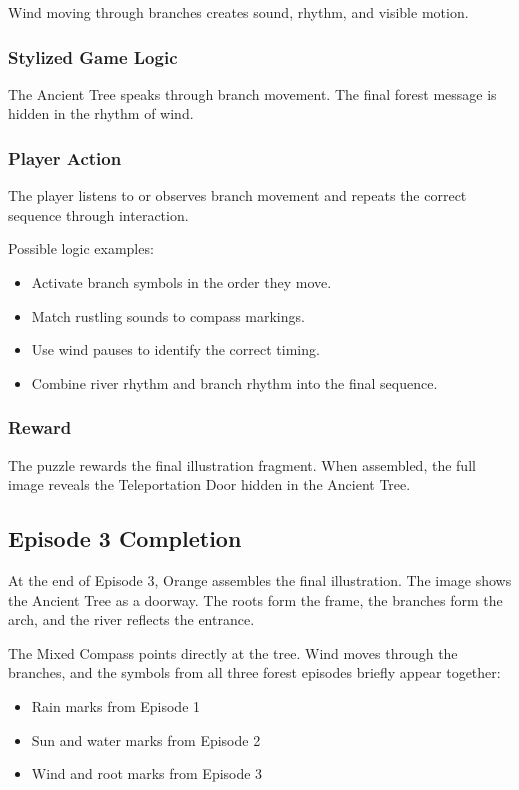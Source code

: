 \documentclass[12pt]{article}
\begin{document}
Wind moving through branches creates sound, rhythm, and visible motion.

\subsubsection{Stylized Game Logic}

The Ancient Tree speaks through branch movement. The final forest message is hidden in the rhythm of wind.

\subsubsection{Player Action}

The player listens to or observes branch movement and repeats the correct sequence through interaction.

Possible logic examples:

\begin{itemize}[leftmargin=*]
    \item Activate branch symbols in the order they move.
    \item Match rustling sounds to compass markings.
    \item Use wind pauses to identify the correct timing.
    \item Combine river rhythm and branch rhythm into the final sequence.
\end{itemize}

\subsubsection{Reward}

The puzzle rewards the final illustration fragment. When assembled, the full image reveals the Teleportation Door hidden in the Ancient Tree.

\subsection{Episode 3 Completion}

At the end of Episode 3, Orange assembles the final illustration. The image shows the Ancient Tree as a doorway. The roots form the frame, the branches form the arch, and the river reflects the entrance.

The Mixed Compass points directly at the tree. Wind moves through the branches, and the symbols from all three forest episodes briefly appear together:

\begin{itemize}[leftmargin=*]
    \item Rain marks from Episode 1
    \item Sun and water marks from Episode 2
    \item Wind and root marks from Episode 3
\end{itemize}
\end{document}
